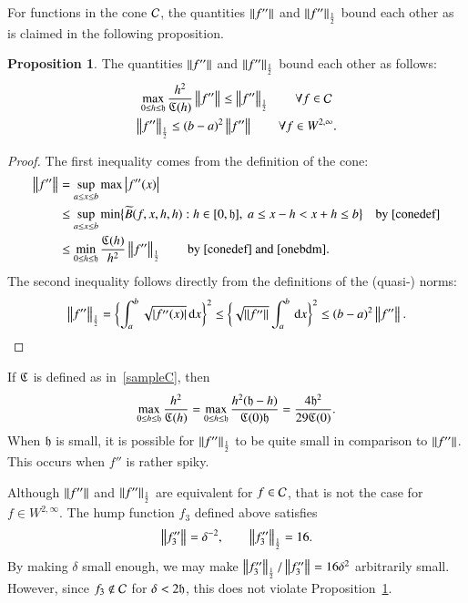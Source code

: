 \documentclass[review]{elsarticle}
\theoremstyle{definition}
\renewcommand{\cw}{W}
\newtheorem{prop}[theorem]{Proposition}
\begin{document}
For functions in the cone $\cc$, the quantities $\norm{f''}$ and $\norm[\frac
12]{f''}$ bound each other as is claimed in the following proposition.

\begin{prop} \label{equivnormprop} The quantities $\norm{f''}$ and $\norm[\frac 12]{f''}$ bound each other as follows:
	\begin{subequations}
		\begin{gather}
		\label{inflesshalf}
		\max_{0 \le h \le \fh} \frac{h^2}{\fC(h)} \norm{f''} \le \norm[\frac 12]{f''} \qquad \forall f \in \cc \\
		\label{halflessinf}
		\norm[\frac 12]{f''}  \le (b-a)^2 \norm{f''} \qquad \forall f \in \cw^{2,\infty}.
		\end{gather}
	\end{subequations}
\end{prop}
\begin{proof}
The first inequality comes from the definition of the cone:
\begin{align*}
\norm{f''} & = \sup_{a \le x \le b} \max \abs{f''(x)} \\
& \le \sup_{a \le x \le b} \min\bigl\{\tB(f,x,h,h) : h \in [0,\fh], \ a \le x - h < x+h \le b \bigr \} \quad \text{by}~\eqref{conedef} \\
& \le \min_{0 \le h \le \fh} \frac{\fC(h)}{h^2}\norm[\frac 12]{f''} \qquad \text{by}~\eqref{conedef} \text{ and}~\eqref{onebdm}.
\end{align*}
The second inequality follows directly from the definitions of the (quasi-) norms:
\begin{equation} \label{onebdm}
\norm[\frac 12]{f''} = \biggl\{ \int_{a}^{b} \sqrt{\abs{f''(x)}} \, \dif x \biggr\}^2 \le\biggl\{\sqrt{\norm{f''}}  \int_{a}^{b} \, \dif x \biggr\}^2 \le  (b - a)^2 \norm{f''}.
\end{equation}
\end{proof}

If $\fC$ is defined as in~\eqref{sampleC}, then
\[
\max_{0 \le h \le \fh} \frac{h^2}{\fC(h)} = \max_{0 \le h \le \fh} \frac{h^2(\fh - h)}{\fC(0)\fh} = \frac{4\fh^2}{29\fC(0)}.
\]
When $\fh$ is small, it is possible for $\norm[\frac 12]{f''} $ to be quite
small in comparison to $\norm{f''}$. This occurs when $f''$ is rather spiky.


Although $\norm{f''}$ and $\norm[\frac 12]{f''} $ are equivalent for $f \in
\cc$, that is not the case for $f \in \cw^{2,\infty}$. The hump function $f_3$
defined above satisfies
\[
\norm{f_3''} = \delta^{-2}, \qquad \norm[\frac 12]{f_3''}  = 16.
\]
By making $\delta$ small enough, we may make $\norm[\frac
12]{f_3''}/\norm{f_3''} = 16\delta^2$ arbitrarily small. However, since $f_3
\notin \cc$ for $\delta < 2\fh$, this does not violate
Proposition~\ref{equivnormprop}.
\end{document}
